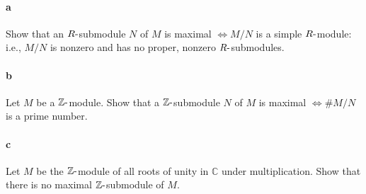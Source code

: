 \hypertarget{a-84}{%
\paragraph{a}\label{a-84}}

Show that an \(R{\hbox{-}}\)submodule \(N\) of \(M\) is maximal
\(\iff M /N\) is a simple \(R{\hbox{-}}\)module: i.e., \(M /N\) is
nonzero and has no proper, nonzero \(R{\hbox{-}}\)submodules.

\hypertarget{b-74}{%
\paragraph{b}\label{b-74}}

Let \(M\) be a \({\mathbb{Z}}{\hbox{-}}\)module. Show that a
\({\mathbb{Z}}{\hbox{-}}\)submodule \(N\) of \(M\) is maximal
\(\iff \#M /N\) is a prime number.

\hypertarget{c-48}{%
\paragraph{c}\label{c-48}}

Let \(M\) be the \({\mathbb{Z}}{\hbox{-}}\)module of all roots of unity
in \({\mathbb{C}}\) under multiplication. Show that there is no maximal
\({\mathbb{Z}}{\hbox{-}}\)submodule of \(M\).

